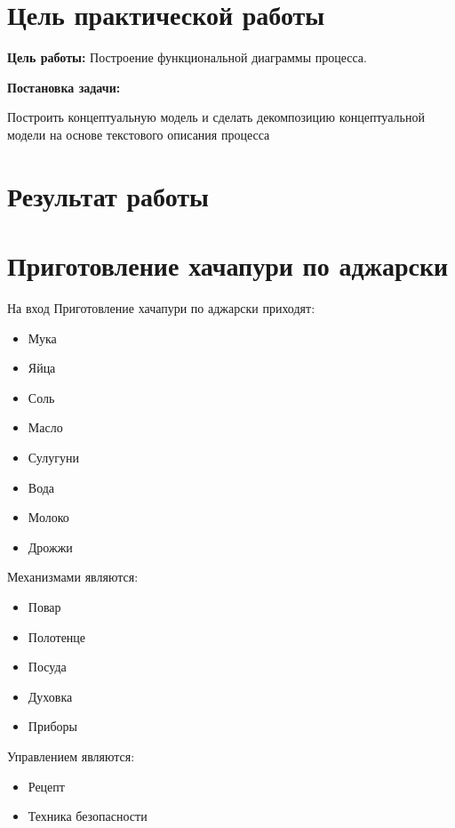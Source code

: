 
\section*{\LARGE Цель практической работы}

\textbf{Цель работы:} Построение функциональной диаграммы процесса.



\textbf{Постановка задачи:}\par
Построить концептуальную модель и сделать
декомпозицию концептуальной модели на основе текстового описания
процесса


\newpage

\section*{\LARGE Результат работы}

\section{Приготовление хачапури по аджарски}

На вход Приготовление хачапури по аджарски приходят:
\begin{itemize}
	\item Мука
	\item Яйца
	\item Соль
	\item Масло
	\item Сулугуни
	\item Вода
	\item Молоко
	\item Дрожжи
\end{itemize}

Механизмами являются:
\begin{itemize}
	\item Повар
	\item Полотенце
	\item Посуда
	\item Духовка
	\item Приборы
\end{itemize}

Управлением являются:
\begin{itemize}
	\item Рецепт
	\item Техника безопасности
\end{itemize}


